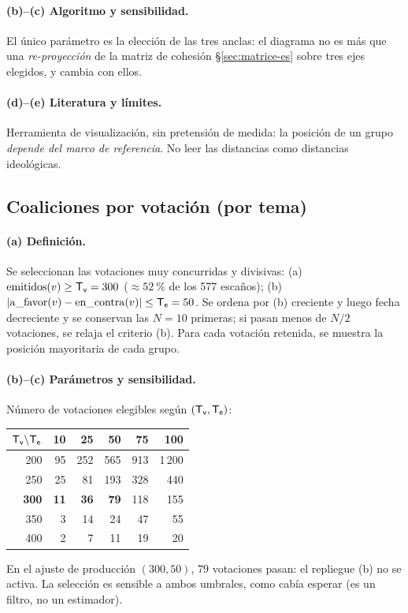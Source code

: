 \paragraph{(b)--(c) Algoritmo y sensibilidad.} El único \og{}parámetro\fg{} es la
elección de las tres anclas: el diagrama no es más que una \emph{re-proyección} de
la matriz de cohesión §\ref{sec:matrice-es} sobre tres ejes elegidos, y cambia con
ellos.

\paragraph{(d)--(e) Literatura y límites.} Herramienta de visualización, sin
pretensión de medida: la posición de un grupo \emph{depende del marco de
referencia}. No leer las distancias como distancias ideológicas.

\subsection{Coaliciones por votación (por tema)}\label{sec:coalitions-es}

\paragraph{(a) Definición.} Se seleccionan las votaciones \og{}muy concurridas y
divisivas\fg{}: (a)~$\text{emitidos}(v)\ge \mathsf{T_v}=300$ ($\approx 52~\%$ de los
577 escaños); (b)~$|\mathrm{a\_favor}(v)-\mathrm{en\_contra}(v)|\le \mathsf{T_e}=50$.
Se ordena por (b) creciente y luego fecha decreciente y se conservan las $N=10$
primeras; si pasan menos de $N/2$ votaciones, se relaja el criterio (b). Para cada
votación retenida, se muestra la posición mayoritaria de cada grupo.

\paragraph{(b)--(c) Parámetros y sensibilidad.} Número de votaciones elegibles según
$(\mathsf{T_v},\mathsf{T_e})$:
\begin{center}\small
\begin{tabular}{r|rrrrr}
\toprule
$\mathsf{T_v}\backslash\mathsf{T_e}$ & 10 & 25 & 50 & 75 & 100 \\
\midrule
200 & \phantom{0}95 & 252 & 565 & 913 & 1\,200 \\
250 & \phantom{0}25 & \phantom{0}81 & 193 & 328 & \phantom{0,}440 \\
\textbf{300} & \phantom{0}\textbf{11} & \phantom{0}\textbf{36} & \phantom{00}\textbf{79} & 118 & \phantom{0,}155 \\
350 & \phantom{00}3 & \phantom{0}14 & \phantom{00}24 & \phantom{0}47 & \phantom{0,0}55 \\
400 & \phantom{00}2 & \phantom{00}7 & \phantom{00}11 & \phantom{0}19 & \phantom{0,0}20 \\
\bottomrule
\end{tabular}
\end{center}
En el ajuste de producción $(300,50)$, $79$ votaciones pasan: el repliegue (b) no se
activa. La selección es sensible a ambos umbrales, como cabía esperar (es un filtro,
no un estimador).


